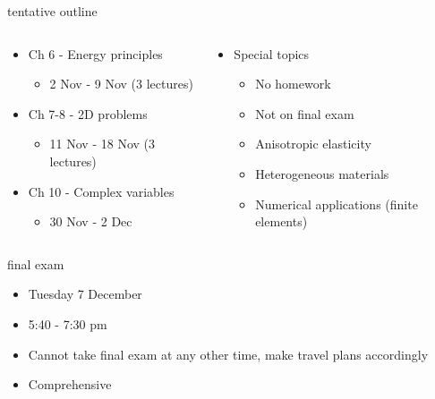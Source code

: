 \documentclass[
  letterpaper,
  ignorenonframetext,
  aspectratio=43,
  handout,
  12pt]{beamer}
\providecommand{\tightlist}{%
  \setlength{\itemsep}{0pt}\setlength{\parskip}{0pt}}
\providecommand{\tightlist}{%
\setlength{\itemsep}{0pt}\setlength{\parskip}{0pt}}
\begin{document}
\begin{frame}{tentative outline}
\protect\hypertarget{tentative-outline-2}{}
\begin{columns}[T]
\begin{column}{0.5\textwidth}
\begin{itemize}
\tightlist
\item
  Ch 6 - Energy principles

  \begin{itemize}
  \tightlist
  \item
    2 Nov - 9 Nov (3 lectures)
  \end{itemize}
\item
  Ch 7-8 - 2D problems

  \begin{itemize}
  \tightlist
  \item
    11 Nov - 18 Nov (3 lectures)
  \end{itemize}
\item
  Ch 10 - Complex variables

  \begin{itemize}
  \tightlist
  \item
    30 Nov - 2 Dec
  \end{itemize}
\end{itemize}
\end{column}

\begin{column}{0.5\textwidth}
\begin{itemize}
\tightlist
\item
  Special topics

  \begin{itemize}
  \tightlist
  \item
    No homework
  \item
    Not on final exam
  \item
    Anisotropic elasticity
  \item
    Heterogeneous materials
  \item
    Numerical applications (finite elements)
  \end{itemize}
\end{itemize}
\end{column}
\end{columns}
\end{frame}

\begin{frame}{final exam}
\protect\hypertarget{final-exam}{}
\begin{itemize}
\tightlist
\item
  Tuesday 7 December
\item
  5:40 - 7:30 pm
\item
  Cannot take final exam at any other time, make travel plans
  accordingly
\item
  Comprehensive
\end{itemize}
\end{frame}
\end{document}
